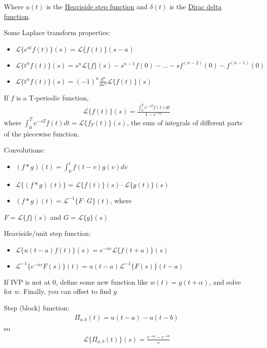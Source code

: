 \documentclass[12pt]{article}
\begin{document}
Where \(u(t)\) is the \href{https://en.wikipedia.org/wiki/Heaviside\_step\_function}{Heaviside step function} and \(\delta(t)\) is the \href{https://en.wikipedia.org/wiki/Dirac\_delta\_function}{Dirac
delta function}.

Some Laplace transform properties:

\begin{itemize}
\item \(\mathcal{L}\{e^{at}f(t)\}(s) = \mathcal{L}\{f(t)\}(s-a)\)
\item \(\mathcal{L}\{t^nf(t)\}(s) =
  s^n\mathcal{L}\{f\}(s)-s^{n-1}f(0)-\ldots-sf^{(n-2)}(0)-f^{(n-1)}(0)\)
\item \(\mathcal{L}\{t^nf(t)\}(s) = (-1)^n \frac{d^n}{ds^n} \mathcal{L}\{f(t)\}(s)\)
\end{itemize}

If \(f\) is a T-periodic function, 
\begin{align*}
	\mathcal{L}\{f(t)\}(s) = \frac{\int_0^T e^{-sT} f(t) dt}{1-e^{-sT}}
\end{align*}
where \(\int_0^T e^{-sT} f(t) dt = \mathcal{L}\{f_T(t)\}(s)\), the sum of
integrals of different parts of the piecewise function.

Convolutions:

\begin{itemize}
\item \((f*g)(t) = \int_0^t f(t-v)g(v)dv\)
\item \(\mathcal{L}\{(f*g)(t)\} = \mathcal{L}\{f(t)\}(s)\cdot \mathcal{L}\{g(t)\}(s)\)
\item \((f*g)(t) = \mathcal{L}^{-1}\{F\cdot G\}(t)\), where
\end{itemize}
\(F=\mathcal{L}\{f\}(s)\) and \(G=\mathcal{L}\{g\}(s)\)

Heaviside/unit step function:

\begin{itemize}
\item \(\mathcal{L}\{u(t-a)f(t)\}(s) = e^{-as}\mathcal{L}\{f(t+a)\}(s)\)
\item \(\mathcal{L}^{-1}\{e^{-as}F(s)\}(t)=u(t-a)\mathcal{L}^{-1}\{F(s)\}(t-a)\)
\end{itemize}

If IVP is not at 0, define some new function like \(w(t)=y(t+\alpha)\), and
solve for \(w\). Finally, you can offset to find \(y\)

Step (block) function:
\begin{align*}
	\Pi_{a,b}(t) = u(t-a)-u(t-b)
\end{align*}
so
\begin{align*}
	\mathcal{L}\{\Pi_{a,b}(t)\}(s)=\frac{e^{-sa}-e^{-sb}}{s}
\end{align*}
\end{document}
